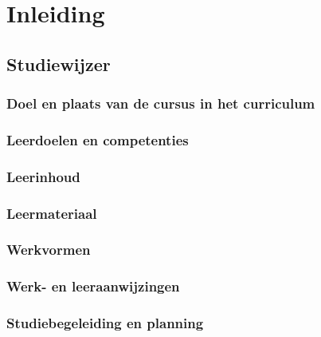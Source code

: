 \chapter*{Inleiding}
\label{ch:inleiding}

\section{Studiewijzer}
\label{sec:studiewijzer}

\subsection{Doel en plaats van de cursus in het curriculum}
\label{sec:doel-en-plaats}

\lipsum[3-4]

\subsection{Leerdoelen en competenties}
\label{sec:leerdoelen}

\lipsum[5-6]

\subsection{Leerinhoud}
\label{sec:leerinhoud}

\lipsum[7-9]

\subsection{Leermateriaal}
\label{sec:leermateriaal}

\lipsum[10-12]

\subsection{Werkvormen}
\label{sec:werkvormen}

\lipsum[13]

\subsection{Werk- en leeraanwijzingen}
\label{sec:werk-en-leeraanwijzingen}

\lipsum[14]

\subsection{Studiebegeleiding en planning}
\label{sec:studiebegeleiding-en-planning}

